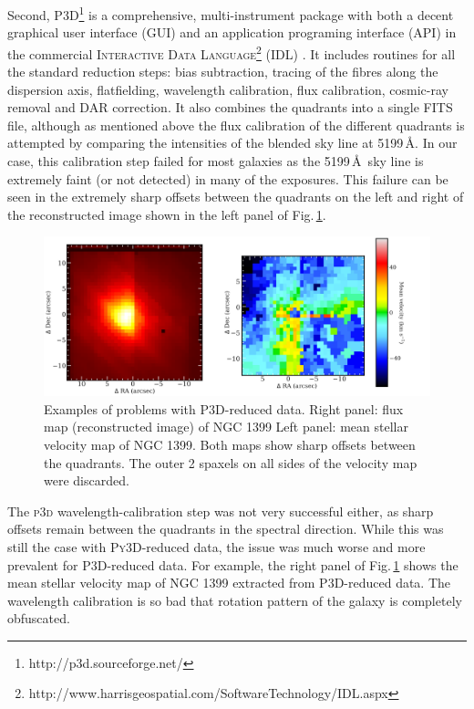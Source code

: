 		Second, \textsc{P3D}\footnote{http://p3d.sourceforge.net/} is a comprehensive, multi-instrument package with both a decent graphical user interface (GUI) and an application programing interface (API) in the commercial \textsc{Interactive Data Language}\footnote{http://www.harrisgeospatial.com/SoftwareTechnology/IDL.aspx} (\textsc{IDL}) \citep{Sandin2010, Sandin2011}. It includes routines for all the standard reduction steps: bias subtraction, tracing of the fibres along the dispersion axis, flatfielding, wavelength calibration, flux calibration, cosmic-ray removal and DAR correction. It also combines the quadrants into a single FITS file, although as mentioned above the flux calibration of the different quadrants is attempted by comparing the intensities of the blended sky line at 5199\,\AA. In our case, this calibration step failed for most galaxies as the 5199\,\AA\ sky line is extremely faint (or not detected) in many of the exposures. This failure can be seen in the extremely sharp offsets between the quadrants on the left and right of the reconstructed image shown in the left panel of Fig.\,\ref{fig:P3D}. 

		\begin{figure}
			\centering
			\includegraphics[width=.9\textwidth]{chapter2/P3D_NGC1399.png}
			\caption[\textsc{P3D}-reduced data problems]{Examples of problems with \textsc{P3D}-reduced data. Right panel: flux map (reconstructed image) of NGC 1399 Left panel: mean stellar velocity map of NGC 1399. Both maps show sharp offsets between the quadrants. The outer 2 spaxels on all sides of the velocity map were discarded.}
			\label{fig:P3D}
		\end{figure}


		The \textsc{p3d} wavelength-calibration step was not very successful either, as sharp offsets remain between the quadrants in the spectral direction. While this was still the case with \textsc{Py3D}-reduced data, the issue was much worse and more prevalent for \textsc{P3D}-reduced data. For example, the right panel of Fig.\,\ref{fig:P3D} shows the mean stellar velocity map of NGC 1399 extracted from \textsc{P3D}-reduced data. The wavelength calibration is so bad that rotation pattern of the galaxy is completely obfuscated.


